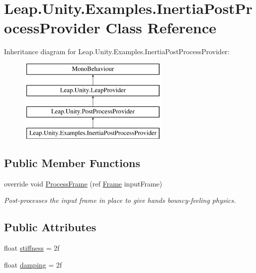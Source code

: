 \hypertarget{class_leap_1_1_unity_1_1_examples_1_1_inertia_post_process_provider}{}\section{Leap.\+Unity.\+Examples.\+Inertia\+Post\+Process\+Provider Class Reference}
\label{class_leap_1_1_unity_1_1_examples_1_1_inertia_post_process_provider}
Inheritance diagram for Leap.\+Unity.\+Examples.\+Inertia\+Post\+Process\+Provider\+:\begin{figure}[H]
\begin{center}
\leavevmode
\includegraphics[height=4.000000cm]{class_leap_1_1_unity_1_1_examples_1_1_inertia_post_process_provider}
\end{center}
\end{figure}
\subsection*{Public Member Functions}
\begin{DoxyCompactItemize}
\item 
override void \mbox{\hyperlink{class_leap_1_1_unity_1_1_examples_1_1_inertia_post_process_provider_af9c64ac46fd83f591cbbdb5e35e35213}{Process\+Frame}} (ref \mbox{\hyperlink{class_leap_1_1_frame}{Frame}} input\+Frame)
\begin{DoxyCompactList}\small\item\em Post-\/processes the input frame in place to give hands bouncy-\/feeling physics. \end{DoxyCompactList}\end{DoxyCompactItemize}
\subsection*{Public Attributes}
\begin{DoxyCompactItemize}
\item 
float \mbox{\hyperlink{class_leap_1_1_unity_1_1_examples_1_1_inertia_post_process_provider_a5ec6ca4a850850dcffdae36d74e75e6e}{stiffness}} = 2f
\item 
float \mbox{\hyperlink{class_leap_1_1_unity_1_1_examples_1_1_inertia_post_process_provider_a4c1323ad732c8cec8de2c90239b6de60}{damping}} = 2f
\end{DoxyCompactItemize}
